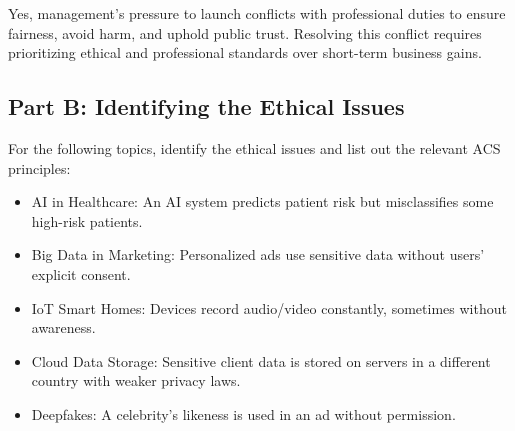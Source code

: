 Yes, management’s pressure to launch conflicts with professional duties to ensure fairness, avoid harm, and uphold public trust. Resolving this conflict requires prioritizing ethical and professional standards over short-term business gains.

\subsection{Part B: Identifying the Ethical Issues}

For the following topics, identify the ethical issues and list out the relevant ACS principles:

\begin{itemize}
    \item AI in Healthcare: An AI system predicts patient risk but misclassifies some high-risk patients.
    \item Big Data in Marketing: Personalized ads use sensitive data without users’ explicit consent.
    \item IoT Smart Homes: Devices record audio/video constantly, sometimes without awareness.
    \item Cloud Data Storage: Sensitive client data is stored on servers in a different country with weaker privacy laws.
    \item Deepfakes: A celebrity’s likeness is used in an ad without permission.
\end{itemize}

